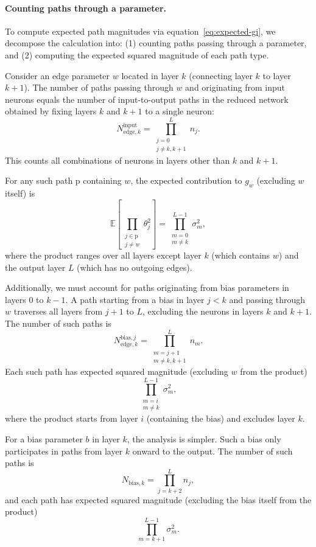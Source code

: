 \documentclass{article}
\theoremstyle{plain}
\theoremstyle{definition}
\theoremstyle{remark}
\def\path{{\mathrm{p}}}
\begin{document}
\paragraph{Counting paths through a parameter.}
To compute expected path magnitudes via equation~\eqref{eq:expected-gi}, we decompose the calculation into: (1) counting paths passing through a parameter, and (2) computing the expected squared magnitude of each path type.

Consider an edge parameter $w$ located in layer $k$ (connecting layer $k$ to layer $k+1$). The number of paths passing through $w$ and originating from input neurons equals the number of input-to-output paths in the reduced network obtained by fixing layers $k$ and $k+1$ to a single neuron:
\[
N_{\text{edge},k}^{\text{input}} = \prod_{\substack{j=0 \\ j \neq k, k+1}}^{L} n_j.
\]
This counts all combinations of neurons in layers other than $k$ and $k+1$.

For any such path $\path$ containing $w$, the expected contribution to $g_w$ (excluding $w$ itself) is
\[
\mathbb{E}\left[\prod_{\substack{j \in \path\\ j \neq w}} \theta_j^2\right] = \prod_{\substack{m=0 \\ m \neq k}}^{L-1} \sigma_m^2,
\]
where the product ranges over all layers except layer $k$ (which contains $w$) and the output layer $L$ (which has no outgoing edges).

Additionally, we must account for paths originating from bias parameters in layers $0$ to $k-1$. A path starting from a bias in layer $j < k$ and passing through $w$ traverses all layers from $j+1$ to $L$, excluding the neurons in layers $k$ and $k+1$. The number of such paths is
\[
N_{\text{edge},k}^{\text{bias},j} = \prod_{\substack{m=j+1 \\ m \neq k, k+1}}^{L} n_m.
\]
Each such path has expected squared magnitude (excluding $w$ from the product)
\[
\prod_{\substack{m=i \\ m \neq k}}^{L-1} \sigma_m^2,
\]
where the product starts from layer $i$ (containing the bias) and excludes layer $k$.

For a bias parameter $b$ in layer $k$, the analysis is simpler. Such a bias only participates in paths from layer $k$ onward to the output. The number of such paths is
\[
N_{\text{bias},k} = \prod_{j=k+2}^{L} n_j,
\]
and each path has expected squared magnitude (excluding the bias itself from the product)
\[
\prod_{m=k+1}^{L-1} \sigma_m^2.
\]
\end{document}

